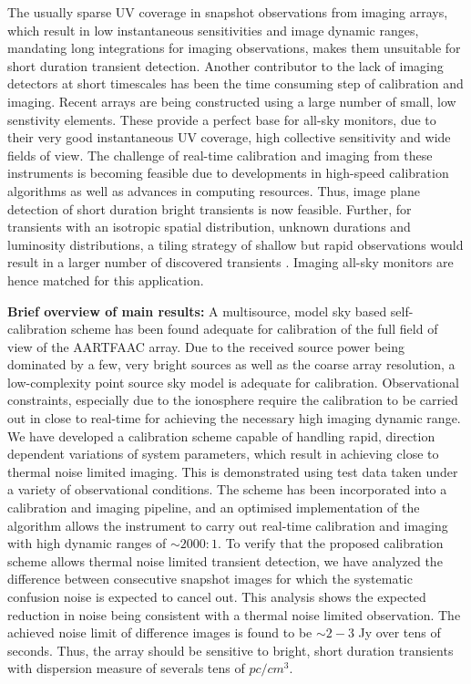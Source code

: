 \documentclass{aa}
\begin{document}
The usually  sparse UV  coverage in snapshot  observations from  imaging arrays,
which  result  in low  instantaneous  sensitivities  and  image dynamic  ranges,
mandating long integrations for  imaging observations, makes them unsuitable for
short duration transient detection.  Another  contributor to the lack of imaging
detectors at  short timescales has been  the time consuming  step of calibration
and imaging. Recent arrays are being  constructed using a large number of small,
low senstivity elements. These provide  a perfect base for all-sky monitors, due
to their  very good instantaneous  UV coverage, high collective  sensitivity and
wide fields  of view.  The challenge  of real-time calibration  and imaging from
these  instruments  is  becoming  feasible  due to  developments  in  high-speed
calibration algorithms as  well as advances in computing  resources. Thus, image
plane detection  of short duration  bright transients is now  feasible. Further,
for  transients with an  isotropic spatial  distribution, unknown  durations and
luminosity distributions,  a tiling strategy  of shallow but  rapid observations
would    result    in    a    larger    number    of    discovered    transients
\citep {nemiroff2003tile}.  Imaging  all-sky monitors are hence  matched for this
application.

\textbf{Brief  overview  of  main  results:}  A  multisource,  model  sky  based
self-calibration  scheme has  been found  adequate for  calibration of  the full
field of  view of the  AARTFAAC array.  Due  to the received source  power being
dominated by a few, very bright  sources as well as the coarse array resolution,
a  low-complexity   point  source  sky   model  is  adequate   for  calibration.
Observational  constraints,  especially  due   to  the  ionosphere  require  the
calibration to be carried out in  close to real-time for achieving the necessary
high imaging dynamic  range.  We have developed a  calibration scheme capable of
handling  rapid,  direction dependent  variations  of  system parameters,  which
result in achieving close to thermal noise limited imaging. This is demonstrated
using test data  taken under a variety of  observational conditions.  The scheme
has been incorporated into a  calibration and imaging pipeline, and an optimised
implementation of  the algorithm  allows the instrument  to carry  out real-time
calibration  and  imaging  with   high  dynamic  ranges  of  $\sim2000:1$.  To verify that the proposed calibration scheme allows thermal noise limited transient detection, we have analyzed the difference between consecutive snapshot images for which the systematic confusion noise is expected to cancel out. This analysis shows the expected reduction in noise being consistent with a thermal noise limited observation. The achieved noise limit of difference images is found to be $\sim2-3$
Jy over tens of seconds.  Thus, the  array should be sensitive  to bright, short
duration transients with  dispersion measure of severals tens of $pc/cm^3$.
 
\end{document}
